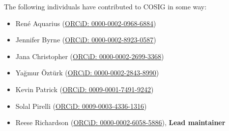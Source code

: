 \documentclass[letterpaper, 12pt]{article}
\begin{document}
\pagebreak

The following individuals have contributed to COSIG in some way:

\begin{itemize}
    \setlength\itemsep{-0.5em}
    \item Ren\'e Aquarius (\href{https://orcid.org/0000-0002-0968-6884}{ORCiD: 0000-0002-0968-6884})
    \item Jennifer Byrne (\href{https://orcid.org/0000-0002-8923-0587}{ORCiD: 0000-0002-8923-0587})
    \item Jana Christopher (\href{https://orcid.org/0000-0002-2699-3368}{ORCiD: 0000-0002-2699-3368})
    \item Ya\u gmur \"Ozt\"urk (\href{https://orcid.org/0000-0002-2843-8990}{ORCiD: 0000-0002-2843-8990})
    \item Kevin Patrick (\href{https://orcid.org/0009-0001-7491-9242}{ORCiD: 0009-0001-7491-9242})
    \item Solal Pirelli (\href{https://orcid.org/0009-0003-4336-1316}{ORCiD: 0009-0003-4336-1316})
    \item Reese Richardson (\href{https://orcid.org/0000-0002-6058-5886}{ORCiD: 0000-0002-6058-5886}), \textbf{Lead maintainer}
\end{itemize}
\end{document}
